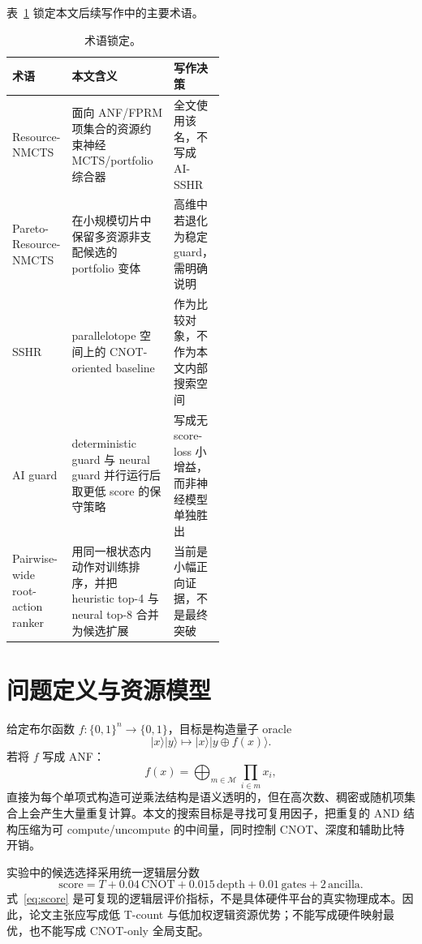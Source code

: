 \documentclass[UTF8,fontset=macnew,11pt]{ctexart}
\newcommand{\method}{Resource-NMCTS}
\newcommand{\pareto}{Pareto-Resource-NMCTS}
\newcommand{\score}{\ensuremath{\mathrm{score}}}
\begin{document}
表~\ref{tab:terminology} 锁定本文后续写作中的主要术语。

\begin{table}[t]
\centering
\small
\caption{术语锁定。}
\label{tab:terminology}
\begin{tabularx}{\linewidth}{>{\raggedright\arraybackslash}p{0.28\linewidth}
  >{\raggedright\arraybackslash}X
  >{\raggedright\arraybackslash}p{0.24\linewidth}}
\toprule
术语 & 本文含义 & 写作决策 \\
\midrule
\method{} & 面向 ANF/FPRM 项集合的资源约束神经 MCTS/portfolio 综合器 & 全文使用该名，不写成 AI-SSHR \\
\pareto{} & 在小规模切片中保留多资源非支配候选的 portfolio 变体 & 高维中若退化为稳定 guard，需明确说明 \\
SSHR & parallelotope 空间上的 CNOT-oriented baseline & 作为比较对象，不作为本文内部搜索空间 \\
AI guard & deterministic guard 与 neural guard 并行运行后取更低 score 的保守策略 & 写成无 score-loss 小增益，而非神经模型单独胜出 \\
Pairwise-wide root-action ranker & 用同一根状态内动作对训练排序，并把 heuristic top-4 与 neural top-8 合并为候选扩展 & 当前是小幅正向证据，不是最终突破 \\
\bottomrule
\end{tabularx}
\end{table}

\section{问题定义与资源模型}

给定布尔函数 $f:\{0,1\}^{n}\rightarrow\{0,1\}$，目标是构造量子 oracle
\[
  |x\rangle|y\rangle \mapsto |x\rangle|y\oplus f(x)\rangle .
\]
若将 $f$ 写成 ANF：
\[
  f(x)=\bigoplus_{m\in\mathcal{M}}\prod_{i\in m}x_i ,
\]
直接为每个单项式构造可逆乘法结构是语义透明的，但在高次数、稠密或随机项集合上会产生大量重复计算。本文的搜索目标是寻找可复用因子，把重复的 AND 结构压缩为可 compute/uncompute 的中间量，同时控制 CNOT、深度和辅助比特开销。

实验中的候选选择采用统一逻辑层分数
\begin{equation}
  \score = T + 0.04\,\mathrm{CNOT} + 0.015\,\mathrm{depth}
         + 0.01\,\mathrm{gates} + 2\,\mathrm{ancilla}.
  \label{eq:score}
\end{equation}
式~\eqref{eq:score} 是可复现的逻辑层评价指标，不是具体硬件平台的真实物理成本。因此，论文主张应写成低 T-count 与低加权逻辑资源优势；不能写成硬件映射最优，也不能写成 CNOT-only 全局支配。
\end{document}
